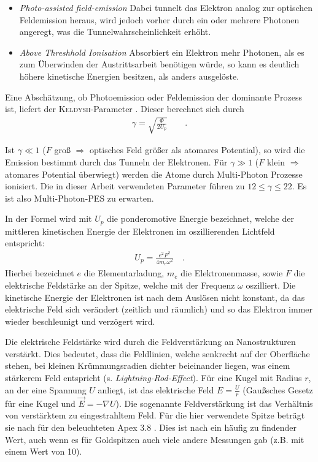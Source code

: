 \documentclass[bachelor,       %
               twoside,        %
               BCOR10mm,       %
               english,ngerman, %
               ]{GAUBM}
\begin{document}
\begin{itemize}
	\item \textit{Photo-assisted field-emission} Dabei tunnelt das Elektron analog zur optischen Feldemission heraus, wird jedoch vorher durch ein oder mehrere Photonen angeregt, was die Tunnelwahrscheinlichkeit erhöht.
	
	\item \textit{Above Threshhold Ionisation}
	Absorbiert ein Elektron mehr Photonen, als es zum Überwinden der Austrittsarbeit benötigen würde, so kann es deutlich höhere kinetische Energien besitzen, als anders ausgelöste.
	
\end{itemize}
Eine Abschätzung, ob Photoemission oder Feldemission der dominante Prozess ist, liefert der \textsc{Keldysh}-Parameter \cite{keldysh1965}.
Dieser berechnet sich durch
\begin{align}
	\gamma=\sqrt{\frac{\Phi}{2U_p}}\qquad .
	\label{eq:keldysh}
\end{align}

Ist $\gamma\ll 1$ ($F$ groß $\Rightarrow$ optisches Feld grö{\ss}er als atomares Potential), so wird die Emission bestimmt durch das Tunneln der Elektronen.
Für $\gamma\gg 1$ ($F$ klein $\Rightarrow$ atomares Potential überwiegt) werden die Atome durch Multi-Photon Prozesse ionisiert.\newline
Die in dieser Arbeit verwendeten Parameter führen zu $12\leq\gamma\leq22$.
Es ist also Multi-Photon-PES zu erwarten.

In der Formel wird mit $U_{p}$ die ponderomotive Energie bezeichnet, welche der mittleren kinetischen Energie der Elektronen im oszillierenden Lichtfeld entspricht:
\begin{align}
	U_p=\frac{e^2F^2}{4m_e\omega^2} \quad .
	\label{eq:ponderomotiv}
\end{align}
Hierbei bezeichnet $e$ die Elementarladung, $m_e$ die Elektronenmasse, sowie $F$ die elektrische Feldstärke an der Spitze, welche mit der Frequenz $\omega$ oszilliert.
Die kinetische Energie der Elektronen ist nach dem Auslösen nicht konstant, da das elektrische Feld sich verändert (zeitlich und räumlich) und so das Elektron immer wieder beschleunigt und verzögert wird.

Die elektrische Feldstärke wird durch die Feldverstärkung an Nanostrukturen verstärkt.
Dies bedeutet, dass die Feldlinien, welche senkrecht auf der Oberfläche stehen, bei kleinen Krümmungsradien dichter beieinander liegen, was einem stärkerem Feld entspricht (s. \textit{Lightning-Rod-Effect}).
Für eine Kugel mit Radius $r$, an der eine Spannung $U$ anliegt, ist das elektrische Feld $E=\frac{U}{r}$ (Gaußsches Gesetz für eine Kugel und $\vec E=-\nabla U$).
Die sogenannte Feldverstärkung ist das Verhältnis von verstärktem zu eingestrahltem Feld.
Für die hier verwendete Spitze beträgt sie nach \cite{benni_15} für den beleuchteten Apex $3.8$ .
Dies ist nach \cite{thomas_2016} ein häufig zu findender Wert, auch wenn es für Goldspitzen auch viele andere Messungen gab (z.B. \cite{ropers_2007} mit einem Wert von 10).\newline\newline
\end{document}

